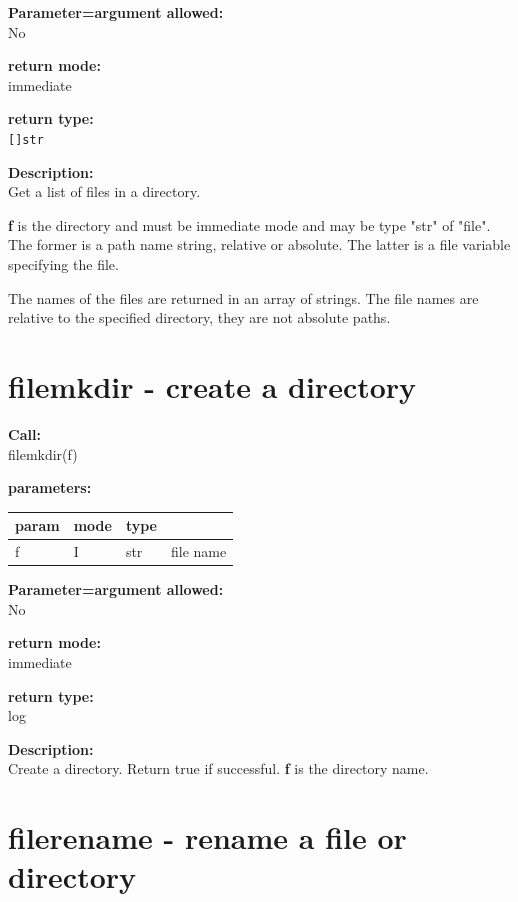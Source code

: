         {\bf Parameter=argument allowed:} \\
        No
        
        {\bf return mode:} \\
        immediate

        {\bf return type:} \\
        \verb'[]str'
        
        {\bf Description:} \\
        Get a list of files in a directory.
        
        {\bf f} is the directory and must be immediate mode and may be type "str"
        of "file". The former is a path name string, relative or absolute.
        The latter is a file variable specifying the file.
 
        The names of the files are returned in an array of strings. The file
        names are relative to the specified directory, they are not absolute
        paths.


    \section{filemkdir - create a directory}\label{sec:iffilemkdir}
        
        {\bf Call:} \\
        filemkdir(f)
        
        {\bf parameters:} \\
        \begin{tabular}{| l | l | l | l |}
        \hline
        param  & mode & type & \\
        \hline \hline
        f & I & str & file name \\ \hline
        \end{tabular}
        
        {\bf Parameter=argument allowed:} \\
        No
        
        {\bf return mode:} \\
        immediate

        {\bf return type:} \\
        log
        
        {\bf Description:} \\
        Create a directory. Return true if successful.
        {\bf f} is the directory name.
 


    \section{filerename - rename a file or directory}\label{sec:iffilerename}
        
